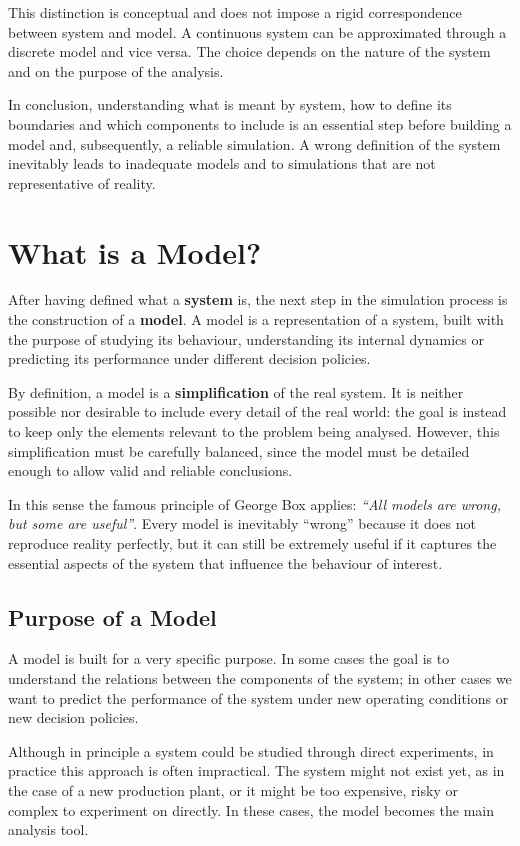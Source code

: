 This distinction is conceptual and does not impose a rigid correspondence between system and model. A continuous system can be approximated through a discrete model and vice versa. The choice depends on the nature of the system and on the purpose of the analysis.

In conclusion, understanding what is meant by system, how to define its boundaries and which components to include is an essential step before building a model and, subsequently, a reliable simulation. A wrong definition of the system inevitably leads to inadequate models and to simulations that are not representative of reality.

\section{What is a Model?}

After having defined what a \textbf{system} is, the next step in the simulation process is the construction of a \textbf{model}. A model is a representation of a system, built with the purpose of studying its behaviour, understanding its internal dynamics or predicting its performance under different decision policies.

By definition, a model is a \textbf{simplification} of the real system. It is neither possible nor desirable to include every detail of the real world: the goal is instead to keep only the elements relevant to the problem being analysed. However, this simplification must be carefully balanced, since the model must be detailed enough to allow valid and reliable conclusions.

In this sense the famous principle of George Box applies: \emph{“All models are wrong, but some are useful”}. Every model is inevitably “wrong” because it does not reproduce reality perfectly, but it can still be extremely useful if it captures the essential aspects of the system that influence the behaviour of interest.

\subsection{Purpose of a Model}

A model is built for a very specific purpose. In some cases the goal is to understand the relations between the components of the system; in other cases we want to predict the performance of the system under new operating conditions or new decision policies.

Although in principle a system could be studied through direct experiments, in practice this approach is often impractical. The system might not exist yet, as in the case of a new production plant, or it might be too expensive, risky or complex to experiment on directly. In these cases, the model becomes the main analysis tool.

